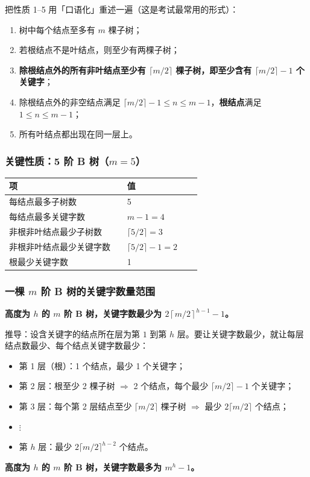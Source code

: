\documentclass[11pt,openany,UTF8]{ctexbook}
\begin{document}
把性质 1–5 用「口语化」重述一遍（这是考试最常用的形式）：

\begin{enumerate}
\item 树中每个结点至多有 $m$ 棵子树；
\item 若根结点不是叶结点，则至少有两棵子树；
\item \textbf{除根结点外的所有非叶结点至少有 $\lceil m/2\rceil$ 棵子树，即至少含有 $\lceil m/2\rceil-1$ 个关键字}；
\item 除根结点外的非空结点满足 $\lceil m/2\rceil-1\le n\le m-1$，\textbf{根结点}满足 $1\le n\le m-1$；
\item 所有叶结点都出现在同一层上。
\end{enumerate}
\subsubsection{关键性质：5 阶 B 树（$m=5$）}

\begingroup\small\setlength{\tabcolsep}{4.0pt}
\begin{longtable}{@{}L{0.5800\linewidth}L{0.3657\linewidth}@{}}
\toprule
\textbf{项} & \textbf{值} \\
\midrule
\endhead
每结点最多子树数 & 5 \\
每结点最多关键字数 & $m-1=4$ \\
非根非叶结点最少子树数 & $\lceil 5/2\rceil=3$ \\
非根非叶结点最少关键字数 & $\lceil 5/2\rceil-1=2$ \\
根最少关键字数 & 1 \\
\bottomrule
\end{longtable}
\endgroup

\subsubsection{一棵 $m$ 阶 B 树的关键字数量范围}

\textbf{高度为 $h$ 的 $m$ 阶 B 树，关键字数最少为 $2\left\lceil m/2\right\rceil^{h-1}-1$。}

推导：设含关键字的结点所在层为第 $1$ 到第 $h$ 层。要让关键字数最少，就让每层结点数最少、每个结点关键字数最少：

\begin{itemize}
\item 第 1 层（根）：1 个结点，最少 1 个关键字；
\item 第 2 层：根至少 2 棵子树 $\Rightarrow$ 2 个结点，每个最少 $\lceil m/2\rceil-1$ 个关键字；
\item 第 3 层：每个第 2 层结点至少 $\lceil m/2\rceil$ 棵子树 $\Rightarrow$ 最少 $2\lceil m/2\rceil$ 个结点；
\item $\vdots$
\item 第 $h$ 层：最少 $2\lceil m/2\rceil^{h-2}$ 个结点。
\end{itemize}
\textbf{高度为 $h$ 的 $m$ 阶 B 树，关键字数最多为 $m^{h}-1$。}
\end{document}
